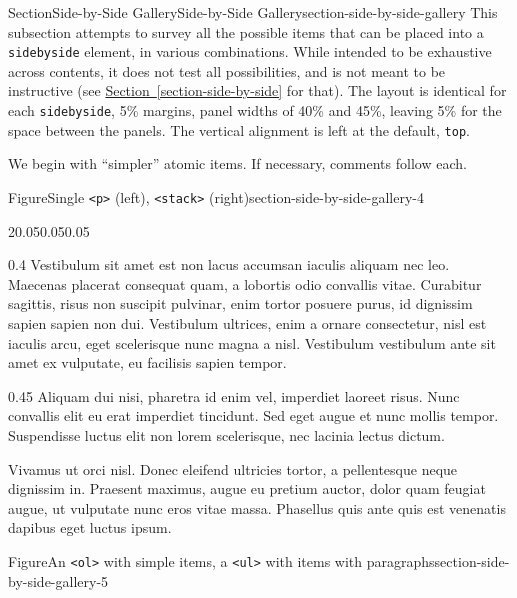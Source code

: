 \documentclass[twoside,10pt,]{article}
\newcommand{\xreffont}{\relax}
\newcommand{\mono}[1]{\texttt{#1}}
\numberwithin{equation}{section}
\begin{document}
%
%
\typeout{************************************************}
\typeout{************************************************}
%
\begin{sectionptx}{Section}{Side-by-Side Gallery}{}{Side-by-Side Gallery}{}{}{section-side-by-side-gallery}
This subsection attempts to survey all the possible items that can be placed into a \mono{sidebyside} element, in various combinations.  While intended to be exhaustive across contents, it does not test all possibilities, and is not meant to be instructive (see \hyperref[section-side-by-side]{Section~{\xreffont\ref{section-side-by-side}}} for that). The layout is identical for each \mono{sidebyside}, 5\% margins, panel widths of 40\% and 45\%, leaving 5\% for the space between the panels.  The vertical alignment is left at the default, \mono{top}.%
\par
We begin with ``simpler'' atomic items.  If necessary, comments follow each.%
\begin{figureptx}{Figure}{Single \mono{<p>} (left), \mono{<stack>} (right)}{section-side-by-side-gallery-4}{}%
\begin{sidebyside}{2}{0.05}{0.05}{0.05}%
\begin{sbspanel}{0.4}%
Vestibulum sit amet est non lacus accumsan iaculis aliquam nec leo. Maecenas placerat consequat quam, a lobortis odio convallis vitae. Curabitur sagittis, risus non suscipit pulvinar, enim tortor posuere purus, id dignissim sapien sapien non dui. Vestibulum ultrices, enim a ornare consectetur, nisl est iaculis arcu, eget scelerisque nunc magna a nisl. Vestibulum vestibulum ante sit amet ex vulputate, eu facilisis sapien tempor.%
\end{sbspanel}%
\begin{sbspanel}{0.45}%
Aliquam dui nisi, pharetra id enim vel, imperdiet laoreet risus. Nunc convallis elit eu erat imperdiet tincidunt. Sed eget augue et nunc mollis tempor. Suspendisse luctus elit non lorem scelerisque, nec lacinia lectus dictum.%
\par
Vivamus ut orci nisl. Donec eleifend ultricies tortor, a pellentesque neque dignissim in. Praesent maximus, augue eu pretium auctor, dolor quam feugiat augue, ut vulputate nunc eros vitae massa. Phasellus quis ante quis est venenatis dapibus eget luctus ipsum.%
\end{sbspanel}%
\end{sidebyside}%
\tcblower
\end{figureptx}%
\begin{figureptx}{Figure}{An \mono{<ol>} with simple items, a \mono{<ul>} with items with paragraphs}{section-side-by-side-gallery-5}{}%

\end{figureptx}
\end{sectionptx}
\end{document}
